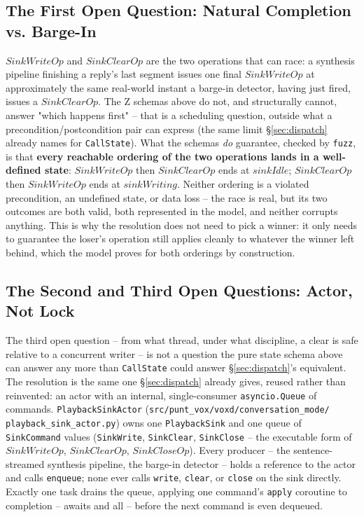 \documentclass[a4paper,10pt,fleqn]{article}
\begin{document}
\subsection{The First Open Question: Natural Completion vs. Barge-In}

$SinkWriteOp$ and $SinkClearOp$ are the two operations that can race: a
synthesis pipeline finishing a reply's last segment issues one final
$SinkWriteOp$ at approximately the same real-world instant a barge-in
detector, having just fired, issues a $SinkClearOp$. The Z schemas above
do not, and structurally cannot, answer "which happens first" -- that is a
scheduling question, outside what a precondition/postcondition pair can
express (the same limit \S\ref{sec:dispatch} already names for
\texttt{CallState}). What the schemas \emph{do} guarantee, checked by
\texttt{fuzz}, is that \textbf{every reachable ordering of the two
operations lands in a well-defined state}: $SinkWriteOp$ then $SinkClearOp$
ends at $sinkIdle$; $SinkClearOp$ then $SinkWriteOp$ ends at $sinkWriting$.
Neither ordering is a violated precondition, an undefined state, or data
loss -- the race is real, but its two outcomes are both valid, both
represented in the model, and neither corrupts anything. This is why the
resolution does not need to pick a winner: it only needs to guarantee the
loser's operation still applies cleanly to whatever the winner left behind,
which the model proves for both orderings by construction.

\subsection{The Second and Third Open Questions: Actor, Not Lock}

The third open question -- from what thread, under what discipline, a clear
is safe relative to a concurrent writer -- is not a question the pure state
schema above can answer any more than \texttt{CallState} could answer
\S\ref{sec:dispatch}'s equivalent. The resolution is the same one
\S\ref{sec:dispatch} already gives, reused rather than reinvented: an actor
with an internal, single-consumer \texttt{asyncio.Queue} of commands.
\texttt{PlaybackSinkActor} (\texttt{src/punt\_vox/voxd/conversation\_mode/
playback\_sink\_actor.py}) owns one \texttt{PlaybackSink} and one queue of
\texttt{SinkCommand} values (\texttt{SinkWrite}, \texttt{SinkClear},
\texttt{SinkClose} -- the executable form of $SinkWriteOp$, $SinkClearOp$,
$SinkCloseOp$). Every producer -- the sentence-streamed synthesis pipeline,
the barge-in detector -- holds a reference to the actor and calls
\texttt{enqueue}; none ever calls \texttt{write}, \texttt{clear}, or
\texttt{close} on the sink directly. Exactly one task drains the queue,
applying one command's \texttt{apply} coroutine to completion -- awaits and
all -- before the next command is even dequeued.
\end{document}

